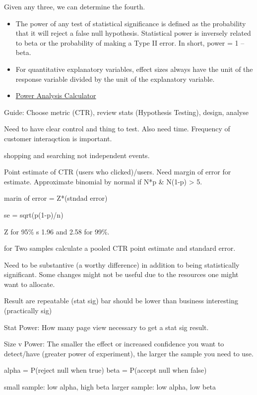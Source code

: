 \documentclass[]{book}
\begin{document}
Given any three, we can determine the fourth.

\begin{itemize}
\item
  The power of any test of statistical significance is defined as the probability that it will reject a false null hypothesis. Statistical power is inversely related to beta or the probability of making a Type II error. In short, power = 1 -- beta.
\item
  For quantitative explanatory variables, effect sizes always have the unit of the response variable divided by the unit of the explanatory variable.
\item
  \href{http://www.evanmiller.org/ab-testing/sample-size.html}{Power Analysis Calculator}
\end{itemize}

Guide: Choose metric (CTR), review stats (Hypothesis Testing), design, analyse

Need to have clear control and thing to test. Also need time. Frequency of customer interaqction is important.

shopping and searching not independent events.

Point estimate of CTR (users who clicked)/users. Need margin of error for estimate. Approximate binomial by normal if N*p \& N(1-p) \textgreater{} 5.

marin of error = Z*(stndad error)

se = sqrt(p(1-p)/n)

Z for 95\% s 1.96 and 2.58 for 99\%.

for Two samples calculate a pooled CTR point estimate and standard error.

Need to be substantive (a worthy difference) in addition to being statistically significant. Some changes might not be useful due to the resources one might want to allocate.

Result are repeatable (stat sig) bar should be lower than business interesting (practically sig)

Stat Power: How many page view necessary to get a stat sig result.

Size v Power: The smaller the effect or increased confidence you want to detect/have (greater power of experiment), the larger the sample you need to use.

alpha = P(reject null when true)
beta = P(accept null when false)

small sample: low alpha, high beta
larger sample: low alpha, low beta
\end{document}

